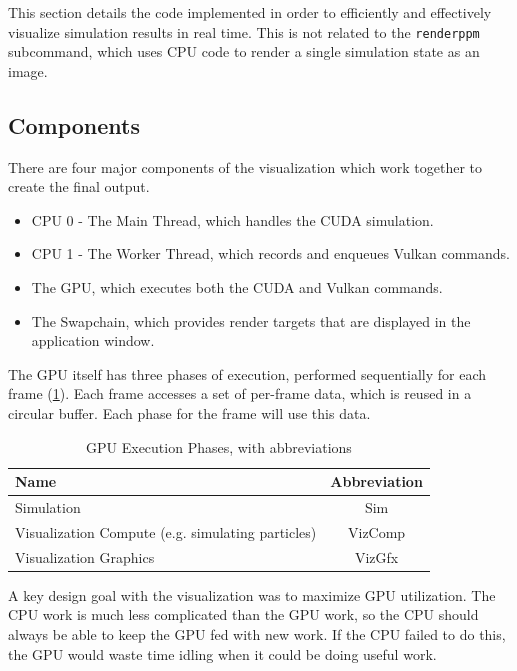 This section details the code implemented in order to efficiently and effectively visualize simulation results in real time.
This is not related to the \texttt{renderppm} subcommand, which uses CPU code to render a single simulation state as an image.

\subsection{Components}
There are four major components of the visualization which work together to create the final output.
\begin{itemize}
    \item CPU 0 - The Main Thread, which handles the CUDA simulation.
    \item CPU 1 - The Worker Thread, which records and enqueues Vulkan commands.
    \item The GPU, which executes both the CUDA and Vulkan commands.
    \item The Swapchain, which provides render targets that are displayed in the application window.
\end{itemize}
The GPU itself has three phases of execution, performed sequentially for each frame (\cref{tab:gpuexecution}).
Each frame accesses a set of per-frame data, which is reused in a circular buffer.
Each phase for the frame will use this data.
\begin{table}[h]
    \centering
    \begin{tabular}{l|c}
    Name & Abbreviation \\
    \hline
    Simulation & Sim \\
    Visualization Compute (e.g. simulating particles) & VizComp \\
    Visualization Graphics & VizGfx \\
    \end{tabular}
    \caption{GPU Execution Phases, with abbreviations}
    \label{tab:gpuexecution}
\end{table}

A key design goal with the visualization was to maximize GPU utilization.
The CPU work is much less complicated than the GPU work, so the CPU should always be able to keep the GPU fed with new work.
If the CPU failed to do this, the GPU would waste time idling when it could be doing useful work.

